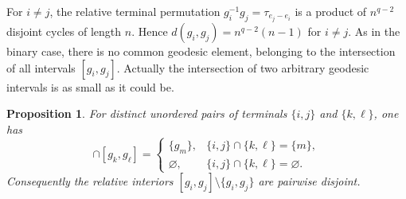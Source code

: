 \documentclass[11pt,oneside,letterpaper]{article}
\numberwithin{equation}{section}
\newtheorem{proposition}[theorem]{Proposition}
\theoremstyle{definition}
\theoremstyle{remark}
\begin{document}
For $i\ne j$, the relative terminal permutation
$g_i^{-1}g_j=\tau_{e_j-e_i}$ is a product of $n^{q-2}$ disjoint cycles
of length $n$.  Hence $d(g_i,g_j)=n^{q-2}(n-1)$ for $i\ne j$. As in the binary case, there is no common geodesic element, belonging to the intersection of all intervals $[g_i,g_j]$. Actually the intersection of two arbitrary geodesic intervals is as small as it could be.

\begin{proposition}
\label{prop:geodesic}
For distinct unordered pairs of terminals $\{i,j\}$ and $\{k,\ell\}$, one has
\begin{equation}
[g_i,g_j]\cap[g_k,g_\ell]
=
\begin{cases}
\{g_m\}, & \{i,j\}\cap\{k,\ell\}=\{m\},\\
\varnothing, & \{i,j\}\cap\{k,\ell\}=\varnothing.
\end{cases}
\label{eq:pairwise-geodesic-interval-intersection}
\end{equation}
Consequently the relative interiors
$[g_i,g_j]\setminus\{g_i,g_j\}$ are pairwise disjoint.
\end{proposition}
\end{document}
